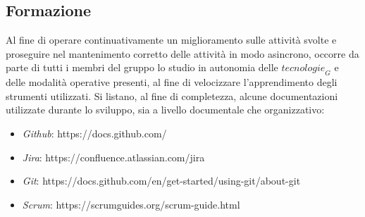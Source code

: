 \subsection{Formazione}
Al fine di operare continuativamente un miglioramento sulle attività svolte e proseguire nel mantenimento corretto delle attività in modo asincrono, occorre da parte di tutti i membri del gruppo lo studio in autonomia delle $\textit{tecnologie}_G$ e delle modalità operative presenti, al fine di velocizzare l'apprendimento degli strumenti utilizzati. Si listano, al fine di
completezza, alcune documentazioni utilizzate durante lo sviluppo, sia a livello documentale che organizzativo:

\begin{itemize}
    \item \textit{Github}: https://docs.github.com/
    \item \textit{Jira}: https://confluence.atlassian.com/jira
    \item \textit{Git}: https://docs.github.com/en/get-started/using-git/about-git
    \item \textit{Scrum}: https://scrumguides.org/scrum-guide.html
\end{itemize}